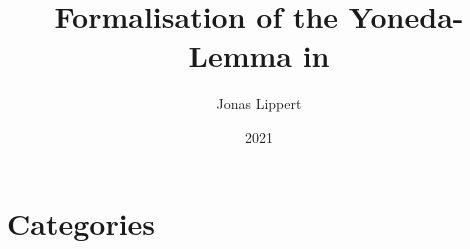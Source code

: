 \documentclass{article}
\title{Formalisation of the Yoneda-Lemma in \Naproche}
\author{Jonas Lippert}
\date{2021}
\begin{document}
	
	\maketitle
	
	

	\newpage
	
	\section{Categories}
	\begin{comment}
	\begin{forthel}
	[synonym arrow/-s][synonym category/categories][synonym functor/-s]
	
	[checktime 10]
	[timelimit 10]
	[depthlimit 10]
	[checkdepth 10]
	\end{forthel}
	\end{comment}
	
\end{document}
